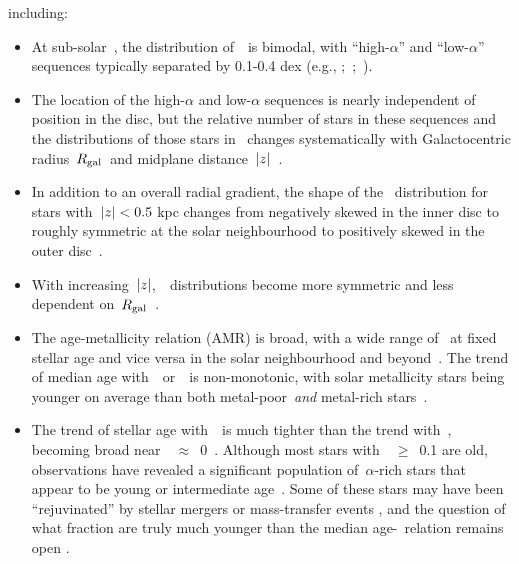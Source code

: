 \documentclass[draft2.tex]{subfiles}
\begin{document}
including: 
\begin{itemize} 
	\item At sub-solar~\feh, the distribution of~\afe~is bimodal, with 
	``high-$\alpha$'' and ``low-$\alpha$'' sequences typically separated by 
	0.1-0.4 dex (e.g., 
	\citealp{Fuhrmann1998};~\citealp*{Bensby2003};~\citealp{Adibekyan2012, 
	Vincenzo2021a}). 

	\item The location of the high-$\alpha$ and low-$\alpha$ sequences is 
	nearly independent of position in the disc, but the relative number of 
	stars in these sequences and the distributions of those stars in 
    \feh~changes systematically with Galactocentric radius~$R_\text{gal}$~and midplane 
	distance~$\left|z\right|$~\citep{Nidever2014, Hayden2015, Weinberg2019}. 

	\item In addition to an overall radial gradient, the shape of the 
	\feh~distribution for stars with~$\left|z\right| < 0.5$ kpc changes from negatively 
	skewed in the inner disc to roughly symmetric at the solar neighbourhood 
	to positively skewed in the outer disc~\citep{Hayden2015, Weinberg2019}. 

	\item With increasing~$\left|z\right|$,~\feh~distributions become more symmetric 
	and less dependent on~$R_\text{gal}$~\citep{Hayden2015}. 

	\item The age-metallicity relation (AMR) is broad, with a wide range of 
	\feh~at fixed stellar age and vice versa in the solar neighbourhood 
	\citep{Edvardsson1993} and beyond~\citep{Feuillet2019}. The trend of 
	median age with~\feh~or~\oh~is non-monotonic, with solar metallicity 
	stars being younger on average than both metal-poor~\textit{and} 
	metal-rich stars~\citep{Feuillet2018, Feuillet2019, Lu2021}. 

	\item The trend of stellar age with~\afe~is much tighter than the trend 
	with~\feh, becoming broad near~\afe~$\approx$~0~\citep{Feuillet2018, 
	Feuillet2019}. Although most stars with~\afe~$\geq$~0.1 are old, 
	observations have revealed a significant population of~$\alpha$-rich stars 
	that appear to be young or intermediate age~\citep{Chiappini2015, 
	Martig2015, Martig2016, Warfield2021}. Some of these stars may have been 
	``rejuvinated'' by stellar mergers or mass-transfer events 
	\citep{Izzard2018, SilvaAguirre2018}, and the question of what fraction 
	are truly much younger than the median age-\afe~relation remains open 
	\citep{Hekker2019}. 
\end{itemize} 
\end{document}

